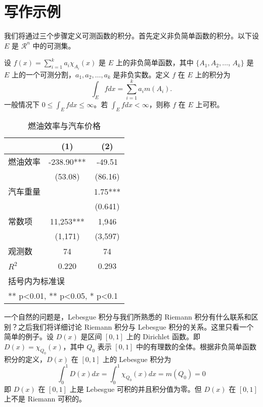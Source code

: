 \documentclass[cn,pad,11pt,green,geye]{../elegantnote}
\begin{document}
\section{写作示例}

我们将通过三个步骤定义可测函数的积分。首先定义非负简单函数的积分。以下设 $E$ 是 $\mathcal{R}^n$ 中的可测集。

\begin{definition}[可积性]
设 $ f(x)=\sum\limits_{i=1}^{k} a_i \chi_{A_i}(x)$ 是 $E$ 上的非负简单函数，其中 $\{A_1,A_2,\ldots$, $A_k\}$ 是 $E$ 上的一个可测分割，$a_1,a_2,\ldots,a_k$ 是非负实数。定义 $f$ 在 $E$ 上的积分为
\begin{equation}
   \label{inter}
   \int_{E} f dx = \sum_{i=1}^k a_i m(A_i).
\end{equation}
一般情况下 $0 \leq \int_{E} f dx \leq \infty$。若 $\int_{E} f dx < \infty$，则称 $f$ 在 $E$ 上可积。
\end{definition}

\begin{table}[htbp]
  \small
  \centering
  \caption{燃油效率与汽车价格}
    \begin{tabular}{lcc}
    \toprule
                    &       (1)         &        (2)      \\
    \midrule
    燃油效率        &    -238.90***     &      -49.51     \\
                    &     (53.08)       &      (86.16)    \\
    汽车重量        &                   &        1.75***  \\
                    &                   &       (0.641)   \\
    常数项          &  11,253***        &    1,946       \\
                    &  (1,171)          &   (3,597)      \\
    观测数          &      74           &       74        \\
    $R^2$           &       0.220       &        0.293    \\
    \bottomrule
    \multicolumn{3}{l}{\scriptsize 括号内为标准误} \\
    \multicolumn{3}{l}{\scriptsize *** p<0.01, ** p<0.05, * p<0.1} \\
    \end{tabular}%
  \label{tab:reg}%
\end{table}%

一个自然的问题是，Lebesgue 积分与我们所熟悉的 Riemann 积分有什么联系和区别？之后我们将详细讨论 Riemann 积分与 Lebesgue 积分的关系。这里只看一个简单的例子。设 $D(x)$ 是区间 $[0,1]$ 上的 Dirichlet 函数。即 $D(x)=\chi_{Q_0}(x)$，其中 $Q_0$ 表示 $[0,1]$ 中的有理数的全体。根据非负简单函数积分的定义，$D(x)$ 在 $[0,1]$ 上的 Lebesgue 积分为
\begin{equation}
   \label{inter2}
   \int_0^1 D(x)dx = \int_0^1 \chi_{Q_0} (x) dx = m(Q_0) = 0
\end{equation}
即 $D(x)$ 在 $[0,1]$ 上是 Lebesgue 可积的并且积分值为零。但 $D(x)$ 在 $[0,1]$ 上不是 Riemann 可积的。
\end{document}
